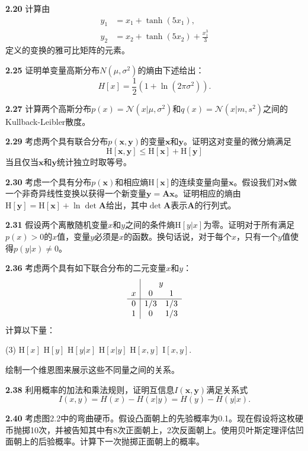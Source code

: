 \documentclass{article}
\begin{document}
\textbf{2.20} 
计算由
\begin{align}
y_1 &= x_1 +\tanh(5x_1), \\
y_2 &= x_2 +\tanh(5x_2) +\frac{x_1^3}{3} 
\end{align}
定义的变换的雅可比矩阵的元素。


\textbf{2.25} 
证明单变量高斯分布$N(\mu,\sigma^2)$的熵由下述给出：
$$
H[x]=\frac{1}{2}(1+\ln (2\pi\sigma^2)).
$$

\textbf{2.27} 
计算两个高斯分布$p(x)=\mathcal{N}\left(x | \mu, \sigma^{2}\right)$和$q(x)=\mathcal{N}\left(x | m, s^{2}\right)$之间的Kullback-Leibler散度。

\textbf{2.29} 
考虑两个具有联合分布$p(\mathbf{x}, \mathbf{y})$的变量$\mathbf{x}$和$\mathbf{y}$。证明这对变量的微分熵满足
\begin{equation}
\mathrm{H}[\mathbf{x}, \mathbf{y}] \leqslant \mathrm{H}[\mathbf{x}]+\mathrm{H}[\mathbf{y}]
\tag{2.130}
\end{equation}
当且仅当$\mathbf{x}$和$\mathbf{y}$统计独立时取等号。

\textbf{2.30} 
考虑一个具有分布$p(\mathbf{x})$和相应熵$\mathrm{H}[\mathbf{x}]$的连续变量向量$\mathbf{x}$。假设我们对$\mathbf{x}$做一个非奇异线性变换以获得一个新变量$\mathbf{y}=\mathbf{A} \mathbf{x}$。证明相应的熵由$\mathrm{H}[\mathbf{y}]=\mathrm{H}[\mathbf{x}]+\ln \operatorname{det} \mathbf{A}$给出，其中$\operatorname{det} \mathbf{A}$表示$\mathbf{A}$的行列式。

\textbf{2.31} 
假设两个离散随机变量$x$和$y$之间的条件熵$\mathrm{H}[y | x]$为零。证明对于所有满足$p(x)>0$的$x$值，变量$y$必须是$x$的函数。换句话说，对于每个$x$，只有一个$y$值使得$p(y | x) \neq 0$。


\textbf{2.36} 
考虑两个具有如下联合分布的二元变量$x$和$y$：
\[
\begin{array}{c|cc}
 & \multicolumn{2}{c}{y} \\
x & 0 & 1 \\
\hline
0 & 1/3 & 1/3 \\
1 & 0 & 1/3 \\
\end{array}
\]
计算以下量：
\begin{tasks}(3)
\task $\mathrm{H}[x]$
\task $\mathrm{H}[y]$
\task $\mathrm{H}[y|x]$
\task $\mathrm{H}[x|y]$
\task $\mathrm{H}[x, y]$
\task $\mathrm{I}[x, y]$.
\end{tasks}
绘制一个维恩图来展示这些不同量之间的关系。

\textbf{2.38} 
利用概率的加法和乘法规则，证明互信息$I(\mathbf{x}, \mathbf{y})$满足关系式
$$
I(x,y) = H(x) - H(x|y) = H(y) -H(y|x). 
$$

\textbf{2.40} 
考虑图2.2中的弯曲硬币。假设凸面朝上的先验概率为0.1。现在假设将这枚硬币抛掷10次，并被告知其中有8次正面朝上，2次反面朝上。使用贝叶斯定理评估凹面朝上的后验概率。计算下一次抛掷正面朝上的概率。
\end{document}
